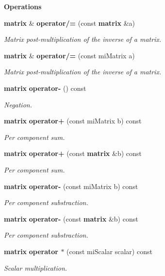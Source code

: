 \begin{Indent}{\bf Operations}
\begin{CompactItemize}
{\bf matrix} \& {\bf operator/=} (const {\bf matrix} \&a)
\begin{CompactList}\small\item\em Matrix post-multiplication of the inverse of a matrix. \item\end{CompactList}\item 
{\bf matrix} \& {\bf operator/=} (const mi\-Matrix a)
\begin{CompactList}\small\item\em Matrix post-multiplication of the inverse of a matrix. \item\end{CompactList}\item 
{\bf matrix} {\bf operator-} () const 
\begin{CompactList}\small\item\em Negation. \item\end{CompactList}\item 
{\bf matrix} {\bf operator+} (const mi\-Matrix b) const 
\begin{CompactList}\small\item\em Per component sum. \item\end{CompactList}\item 
{\bf matrix} {\bf operator+} (const {\bf matrix} \&b) const 
\begin{CompactList}\small\item\em Per component sum. \item\end{CompactList}\item 
{\bf matrix} {\bf operator-} (const mi\-Matrix b) const 
\begin{CompactList}\small\item\em Per component substraction. \item\end{CompactList}\item 
{\bf matrix} {\bf operator-} (const {\bf matrix} \&b) const 
\begin{CompactList}\small\item\em Per component substraction. \item\end{CompactList}\item 
{\bf matrix} {\bf operator $\ast$} (const mi\-Scalar scalar) const 
\begin{CompactList}\small\item\em Scalar multiplication. \item\end{CompactList}\item 

\end{CompactItemize}
\end{Indent}
